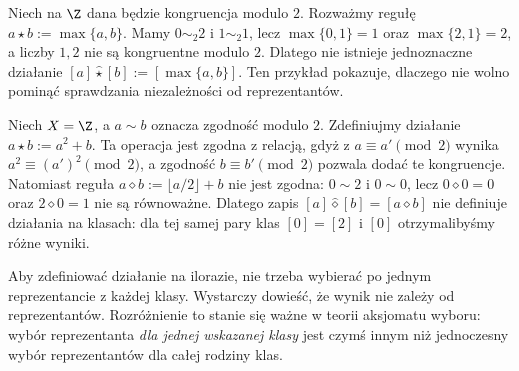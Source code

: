 \begin{przyklad}
Niech na $\Z$ dana będzie kongruencja modulo $2$.
Rozważmy regułę $a\star b:=\max\{a,b\}$.
Mamy $0\sim_2 2$ i $1\sim_2 1$, lecz
$\max\{0,1\}=1$ oraz $\max\{2,1\}=2$, a liczby
$1,2$ nie są kongruentne modulo $2$. Dlatego nie istnieje
jednoznaczne działanie $[a]\widehat\star[b]:=[\max\{a,b\}]$.
Ten przykład pokazuje, dlaczego nie wolno pominąć sprawdzania
niezależności od reprezentantów.
\end{przyklad}


\begin{przyklad}
Niech $X=\Z$, a $a\sim b$ oznacza zgodność modulo $2$.
Zdefiniujmy działanie $a\star b:=a^2+b$. Ta operacja jest
zgodna z relacją, gdyż z $a\equiv a'\pmod 2$ wynika
$a^2\equiv (a')^2\pmod 2$, a zgodność $b\equiv b'\pmod 2$
pozwala dodać te kongruencje. Natomiast reguła
$a\diamond b:=\lfloor a/2\rfloor+b$ nie jest zgodna:
$0\sim 2$ i $0\sim 0$, lecz
$0\diamond0=0$ oraz $2\diamond0=1$ nie są równoważne.
Dlatego zapis $[a]\widehat\diamond[b]=[a\diamond b]$
nie definiuje działania na klasach: dla tej samej pary
klas $[0]=[2]$ i $[0]$ otrzymalibyśmy różne wyniki.
\end{przyklad}

\begin{uwaga}
Aby zdefiniować działanie na ilorazie, nie trzeba wybierać
po jednym reprezentancie z każdej klasy. Wystarczy dowieść,
że wynik nie zależy od reprezentantów. Rozróżnienie to stanie
się ważne w teorii aksjomatu wyboru: wybór reprezentanta
\emph{dla jednej wskazanej klasy} jest czymś innym niż
jednoczesny wybór reprezentantów dla całej rodziny klas.
\end{uwaga}

